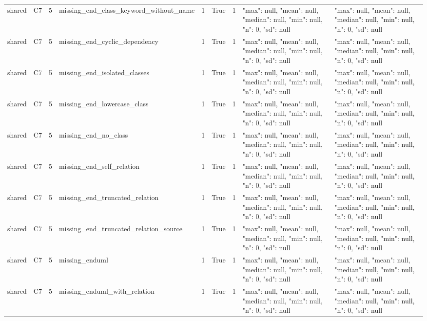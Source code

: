 \begin{tabular}{lllllllll}
shared & C7 & 5 & missing\_end\_class\_keyword\_without\_name & 1 & True & 1 & {"max": null, "mean": null, "median": null, "min": null, "n": 0, "sd": null} & {"max": null, "mean": null, "median": null, "min": null, "n": 0, "sd": null} \\
shared & C7 & 5 & missing\_end\_cyclic\_dependency & 1 & True & 1 & {"max": null, "mean": null, "median": null, "min": null, "n": 0, "sd": null} & {"max": null, "mean": null, "median": null, "min": null, "n": 0, "sd": null} \\
shared & C7 & 5 & missing\_end\_isolated\_classes & 1 & True & 1 & {"max": null, "mean": null, "median": null, "min": null, "n": 0, "sd": null} & {"max": null, "mean": null, "median": null, "min": null, "n": 0, "sd": null} \\
shared & C7 & 5 & missing\_end\_lowercase\_class & 1 & True & 1 & {"max": null, "mean": null, "median": null, "min": null, "n": 0, "sd": null} & {"max": null, "mean": null, "median": null, "min": null, "n": 0, "sd": null} \\
shared & C7 & 5 & missing\_end\_no\_class & 1 & True & 1 & {"max": null, "mean": null, "median": null, "min": null, "n": 0, "sd": null} & {"max": null, "mean": null, "median": null, "min": null, "n": 0, "sd": null} \\
shared & C7 & 5 & missing\_end\_self\_relation & 1 & True & 1 & {"max": null, "mean": null, "median": null, "min": null, "n": 0, "sd": null} & {"max": null, "mean": null, "median": null, "min": null, "n": 0, "sd": null} \\
shared & C7 & 5 & missing\_end\_truncated\_relation & 1 & True & 1 & {"max": null, "mean": null, "median": null, "min": null, "n": 0, "sd": null} & {"max": null, "mean": null, "median": null, "min": null, "n": 0, "sd": null} \\
shared & C7 & 5 & missing\_end\_truncated\_relation\_source & 1 & True & 1 & {"max": null, "mean": null, "median": null, "min": null, "n": 0, "sd": null} & {"max": null, "mean": null, "median": null, "min": null, "n": 0, "sd": null} \\
shared & C7 & 5 & missing\_enduml & 1 & True & 1 & {"max": null, "mean": null, "median": null, "min": null, "n": 0, "sd": null} & {"max": null, "mean": null, "median": null, "min": null, "n": 0, "sd": null} \\
shared & C7 & 5 & missing\_enduml\_with\_relation & 1 & True & 1 & {"max": null, "mean": null, "median": null, "min": null, "n": 0, "sd": null} & {"max": null, "mean": null, "median": null, "min": null, "n": 0, "sd": null} \\

\end{tabular}

